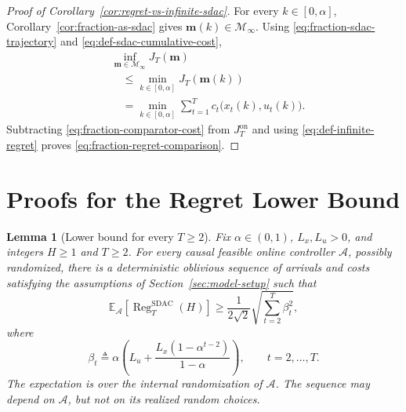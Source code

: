 \documentclass[journal]{IEEEtran}
\newtheorem{lemma}{Lemma}
\theoremstyle{remark}
\newcommand{\RegSDAC}[1]{\operatorname{Reg}_{#1}^{\mathrm{SDAC}}}
\begin{document}
\begin{proof}[Proof of Corollary~\ref{cor:regret-vs-infinite-sdac}]
For every $k\in[0,\alpha]$, Corollary~\ref{cor:fraction-as-sdac} gives
$\mathbf{m}(k)\in\mathcal{M}_\infty$.
Using \eqref{eq:fraction-sdac-trajectory} and
\eqref{eq:def-sdac-cumulative-cost},
\begin{equation}
\label{eq:fraction-comparator-cost}
\begin{aligned}
&\inf_{\mathbf{m}\in\mathcal{M}_\infty}J_T(\mathbf{m})\\
&\quad\le\min_{k\in[0,\alpha]}J_T(\mathbf{m}(k))\\
&\quad=\min_{k\in[0,\alpha]}\sum_{t=1}^T c_t\bigl(x_t(k),u_t(k)\bigr).
\end{aligned}
\end{equation}
Subtracting \eqref{eq:fraction-comparator-cost} from $J_T^{\mathrm{on}}$
and using \eqref{eq:def-infinite-regret} proves
\eqref{eq:fraction-regret-comparison}.
\end{proof}

\section{Proofs for the Regret Lower Bound}
\label{sec:appendix-lower-proofs}

\begin{lemma}[Lower bound for every $T\ge2$]
\label{lem:sdac-lower-finite-horizon}
Fix $\alpha\in(0,1)$, $L_x,L_u>0$, and integers $H\ge1$ and $T\ge2$.
For every causal feasible online controller
$\mathcal{A}$, possibly randomized, there is a deterministic oblivious sequence
of arrivals and costs satisfying the assumptions of
Section~\ref{sec:model-setup} such that
\begin{equation}
\label{eq:sdac-lower-exact}
\mathbb{E}_{\mathcal{A}}\!\left[\RegSDAC{T}(H)\right]
\ge
\frac{1}{2\sqrt{2}}
\sqrt{\sum_{t=2}^T \beta_t^2},
\end{equation}
where
\begin{equation}
\label{eq:sdac-lower-beta}
\beta_t
\triangleq
\alpha\left(
L_u+\frac{L_x(1-\alpha^{t-2})}{1-\alpha}
\right),
\qquad t=2,\ldots,T.
\end{equation}
The expectation is over the internal randomization of $\mathcal{A}$.
The sequence may depend on $\mathcal{A}$, but not on its realized random choices.
\end{lemma}
\end{document}
